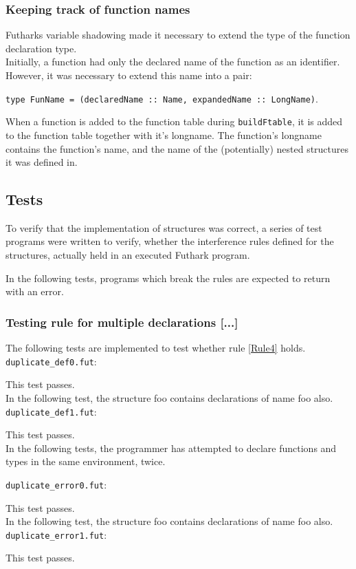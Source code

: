 \subsubsection{Keeping track of function names}
Futharks variable shadowing made it necessary to extend the type of the function
declaration type. \\
Initially, a function had only the declared name of the function as an identifier.
However, it was necessary to extend this name into a pair:

\texttt{type FunName = (declaredName :: Name, expandedName :: LongName)}.

When a function is added to the function table during \texttt{buildFtable}, it
is added to the function table together with it's longname. The function's
longname contains the function's name, and the name of the (potentially) nested
structures it was defined in.

\subsection{Tests}
\label{subsec:structuretests}
To verify that the implementation of structures was correct, a series of test
programs were written to verify, whether the interference rules defined for the
structures, actually held in an executed Futhark program.

In the following tests, programs which break the rules are expected to return
with an error.

\subsubsection{Testing rule for multiple declarations [...]}
The following tests are implemented to test whether rule \ref{Rule4} holds.
\texttt{duplicate\_def0.fut}:

This test passes.
\\
In the following test, the structure foo contains declarations of name foo also.
\texttt{duplicate\_def1.fut}:

This test passes.
\\
In the following tests, the programmer has attempted to declare functions and
types in the same environment, twice.

\texttt{duplicate\_error0.fut}:

This test passes.
\\
In the following test, the structure foo contains declarations of name foo also.
\texttt{duplicate\_error1.fut}:

This test passes.

